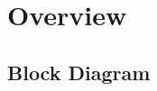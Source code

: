 \section{Overview}
\label{sec:embedded_platform:overview}

\subsection{Block Diagram}
\label{subsec:embedded_platform:overview:block_diagram}
